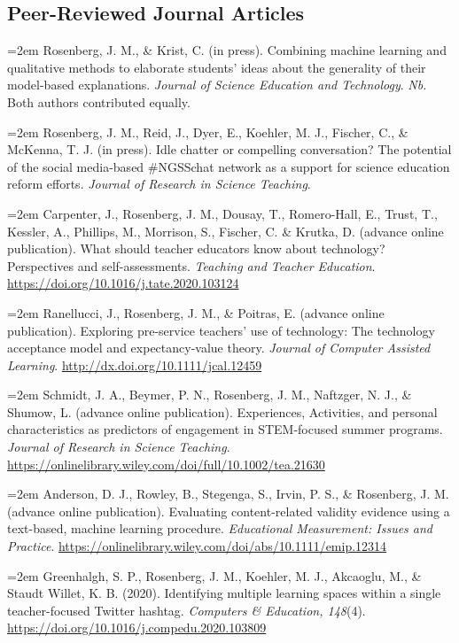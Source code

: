 \documentclass[
  14,
]{article}
\begin{document}
\hypertarget{peer-reviewed-journal-articles}{%
\subsection{Peer-Reviewed Journal
Articles}\label{peer-reviewed-journal-articles}}

\hangindent=2em Rosenberg, J. M., \& Krist, C. (in press). Combining
machine learning and qualitative methods to elaborate students' ideas
about the generality of their model-based explanations. \emph{Journal of
Science Education and Technology}. \emph{Nb.} Both authors contributed
equally.

\hangindent=2em Rosenberg, J. M., Reid, J., Dyer, E., Koehler, M. J.,
Fischer, C., \& McKenna, T. J. (in press). Idle chatter or compelling
conversation? The potential of the social media-based \#NGSSchat network
as a support for science education reform efforts. \emph{Journal of
Research in Science Teaching}.

\hangindent=2em Carpenter, J., Rosenberg, J. M., Dousay, T.,
Romero-Hall, E., Trust, T., Kessler, A., Phillips, M., Morrison, S.,
Fischer, C. \& Krutka, D. (advance online publication). What should
teacher educators know about technology? Perspectives and
self-assessments. \emph{Teaching and Teacher Education}.
\url{https://doi.org/10.1016/j.tate.2020.103124}

\hangindent=2em Ranellucci, J., Rosenberg, J. M., \& Poitras, E.
(advance online publication). Exploring pre-service teachers' use of
technology: The technology acceptance model and expectancy-value theory.
\emph{Journal of Computer Assisted Learning}.
\url{http://dx.doi.org/10.1111/jcal.12459}

\hangindent=2em Schmidt, J. A., Beymer, P. N., Rosenberg, J. M.,
Naftzger, N. J., \& Shumow, L. (advance online publication).
Experiences, Activities, and personal characteristics as predictors of
engagement in STEM-focused summer programs. \emph{Journal of Research in
Science Teaching}.
\url{https://onlinelibrary.wiley.com/doi/full/10.1002/tea.21630}

\hangindent=2em Anderson, D. J., Rowley, B., Stegenga, S., Irvin, P. S.,
\& Rosenberg, J. M. (advance online publication). Evaluating
content-related validity evidence using a text-based, machine learning
procedure. \emph{Educational Measurement: Issues and Practice}.
\url{https://onlinelibrary.wiley.com/doi/abs/10.1111/emip.12314}

\hangindent=2em Greenhalgh, S. P., Rosenberg, J. M., Koehler, M. J.,
Akcaoglu, M., \& Staudt Willet, K. B. (2020). Identifying multiple
learning spaces within a single teacher-focused Twitter hashtag.
\emph{Computers \& Education, 148}(4).
\url{https://doi.org/10.1016/j.compedu.2020.103809}
\end{document}

